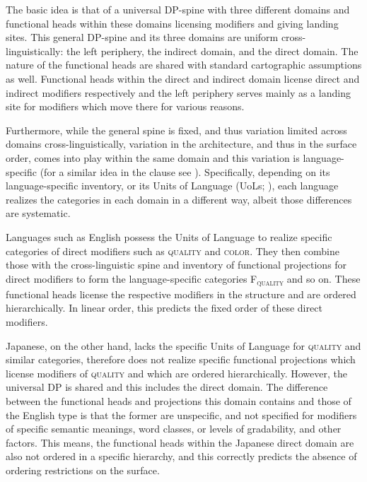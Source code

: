 The basic idea is that of a universal DP-spine with three different domains and functional heads within these domains licensing modifiers and giving landing sites. This general DP-spine and its three domains are uniform cross-linguistically: the left periphery, the indirect domain, and the direct domain. The nature of the functional heads are shared with standard cartographic assumptions as well. Functional heads within the direct and indirect domain license direct and indirect modifiers respectively and the left periphery serves mainly as a landing site for modifiers which move there for various reasons.  

Furthermore, while the general spine is fixed, and thus variation limited across domains cross-linguistically, variation in the architecture, and thus in the surface order, comes into play within the same domain and this variation is language-specific (for a similar idea in the clause see \citealt{ramchand:2014:deriving}). Specifically, depending on its language-specific inventory, or its Units of Language (UoLs; \citealt{wiltschko:2014:universal}), each language realizes the categories in each domain in a different way, albeit those differences are systematic.

Languages such as  English possess the Units of Language to realize specific categories of direct modifiers such as \textsc{quality} and \textsc{color}. They then combine those with the cross-linguistic spine and inventory of functional projections for direct modifiers to form the language-specific categories F\textsubscript{\textsc{quality}} and so on. These functional heads license the respective modifiers in the structure and are ordered hierarchically. In linear order, this   predicts the fixed order of these direct modifiers.

Japanese, on the other hand, lacks the specific Units of Language for \textsc{quality} and similar categories, therefore does not realize specific functional projections which license modifiers of \textsc{quality} and which are ordered hierarchically. However, the universal DP is shared and this includes the direct domain. The difference between the functional heads and projections this domain contains and those of the  English type is that the former are unspecific, and not specified for modifiers of specific semantic meanings, word classes, or levels of gradability, and other factors. This means, the functional heads within the Japanese direct domain are also not ordered in a specific hierarchy, and this correctly predicts the absence of ordering restrictions on the surface.  

